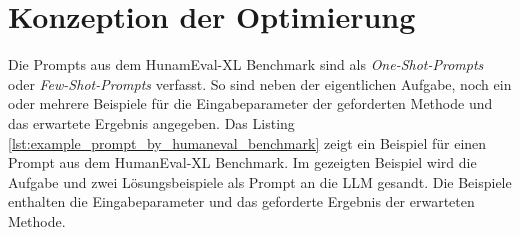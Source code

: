 \section{Konzeption der Optimierung}\label{sec:conzept_of_optimization_prompt}




Die Prompts aus dem HunamEval-XL Benchmark sind als \textit{One-Shot-Prompts} oder \textit{Few-Shot-Prompts} verfasst. So sind neben der eigentlichen Aufgabe, noch ein oder mehrere Beispiele für die Eingabeparameter der geforderten Methode und das erwartete Ergebnis angegeben. Das Listing \ref{lst:example_prompt_by_humaneval_benchmark} zeigt ein Beispiel für einen Prompt aus dem HumanEval-XL Benchmark. Im gezeigten Beispiel wird die Aufgabe und zwei Lösungsbeispiele als Prompt an die LLM gesandt. Die Beispiele enthalten die Eingabeparameter und das geforderte Ergebnis der erwarteten Methode.\vspace{0.2cm}

